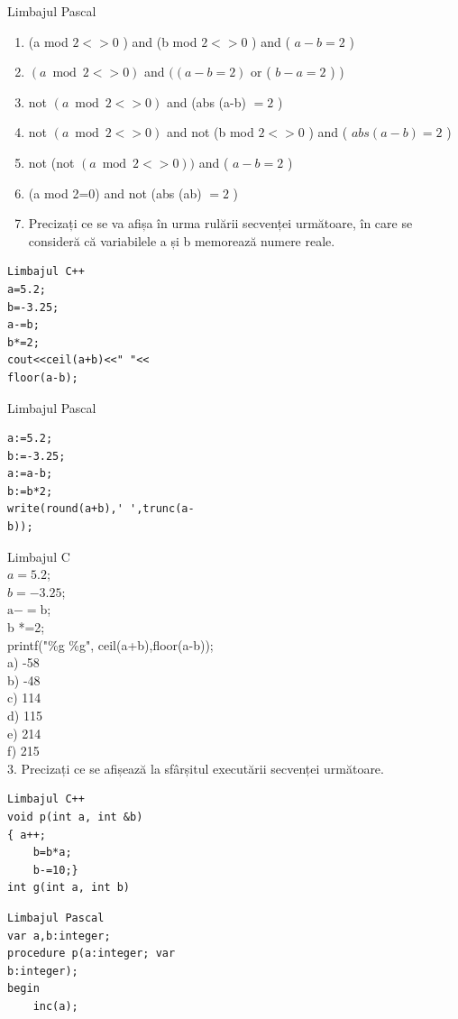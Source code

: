 \documentclass[10pt]{article}
\begin{document}
Limbajul Pascal

\begin{enumerate}
  \item (a mod $2<>0$ ) and (b mod $2<>0$ ) and ( $a-b=2$ )
  \item $(a \bmod 2<>0)$ and $((a-b=2)$ or ( $b-a=2$ ) )
  \item not $(a \bmod 2<>0)$ and (abs (a-b) $=2$ )
  \item not $(a \bmod 2<>0)$ and not (b mod $2<>0$ ) and ( $a b s(a-b)=2$ )
  \item not (not $(a \bmod 2<>0))$ and ( $a-b=2$ )
  \item (a mod 2=0) and not (abs (ab) $=2$ )
  \item Precizați ce se va afișa în urma rulării secvenței următoare, în care se consideră că variabilele a și b memorează numere reale.
\end{enumerate}

\begin{verbatim}
Limbajul C++
a=5.2;
b=-3.25;
a-=b;
b*=2;
cout<<ceil(a+b)<<" "<<
floor(a-b);
\end{verbatim}

Limbajul Pascal

\begin{verbatim}
a:=5.2;
b:=-3.25;
a:=a-b;
b:=b*2;
write(round(a+b),' ',trunc(a-
b));
\end{verbatim}

Limbajul C\\
$a=5.2$;\\
$b=-3.25$;\\
$\mathrm{a}-=\mathrm{b}$;\\
b *=2;\\
printf("\%g \%g", ceil(a+b),floor(a-b));\\
a) -58\\
b) -48\\
c) 114\\
d) 115\\
e) 214\\
f) 215\\
3. Precizați ce se afișează la sfârșitul executării secvenței următoare.

\begin{verbatim}
Limbajul C++
void p(int a, int &b)
{ a++;
    b=b*a;
    b-=10;}
int g(int a, int b)
\end{verbatim}

\begin{verbatim}
Limbajul Pascal
var a,b:integer;
procedure p(a:integer; var
b:integer);
begin
    inc(a);
\end{verbatim}
\end{document}
